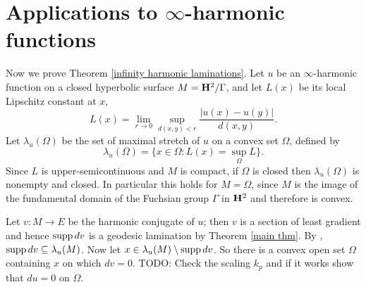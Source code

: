 \section{Applications to $\infty$-harmonic functions} \label{proof of main thm}

Now we prove Theorem \ref{infinity harmonic laminations}.
Let $u$ be an $\infty$-harmonic function on a closed hyperbolic surface $M = \mathbf H^2/\Gamma$, and let $L(x)$ be its local Lipschitz constant at $x$,
$$L(x) = \lim_{r \to 0} \sup_{d(x, y) < r} \frac{|u(x) - u(y)|}{d(x, y)}.$$
Let $\lambda_u(\Omega)$ be the set of maximal stretch of $u$ on a convex set $\Omega$, defined by
$$\lambda_u(\Omega) = \{x \in \Omega: L(x) = \sup_\Omega L\}.$$
Since $L$ is upper-semicontinuous and $M$ is compact, if $\Omega$ is closed then $\lambda_u(\Omega)$ is nonempty and closed.
In particular this holds for $M = \Omega$, since $M$ is the image of the fundamental domain of the Fuchsian group $\Gamma$ in $\mathbf H^2$ and therefore is convex.

Let $v: M \to E$ be the harmonic conjugate of $u$; then $v$ is a section of least gradient and hence $\operatorname{supp} dv$ is a geodesic lamination by Theorem \ref{main thm}.
By \cite[Theorem 6.1]{daskalopoulos2020transverse}, $\operatorname{supp} dv \subseteq \lambda_u(M)$.
Now let $x \in \lambda_u(M) \setminus \operatorname{supp} dv$. So there is a convex open set $\Omega$ containing $x$ on which $dv = 0$. TODO: Check the scaling $k_p$ and if it works show that $du = 0$ on $\Omega$.